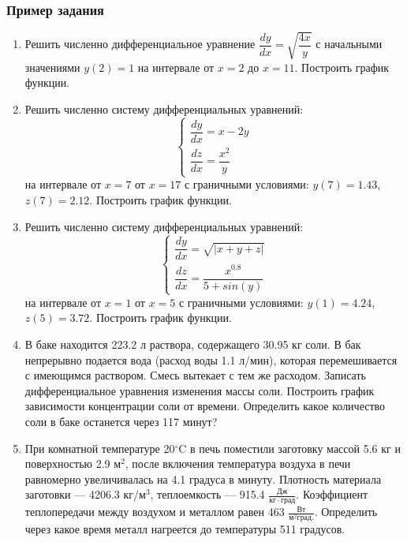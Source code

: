 \subsubsection*{Пример задания}
\begin{enumerate}
	\item Решить численно дифференциальное уравнение $\dfrac{dy}{dx}=\sqrt{\dfrac{4x}{y}}$ с начальными значениями $y(     2)=     1$ на интервале от $x=     2$ до $x=    11$. Построить график функции.\item Решить численно систему дифференциальных уравнений:
	\begin{equation*}
	\left\{
	\begin{gathered}
	\dfrac{dy}{dx}=x-2y                  \\
	\dfrac{dz}{dx}=\dfrac{x^2}{y}        
	\end{gathered}
	\right.
	\end{equation*}
	на интервале от $x= 7$ от $x=17$ с граничными условиями: $y( 7)=1.43$, $z( 7)=2.12$. Построить график функции. 
	\item Решить численно систему дифференциальных уравнений:
	\begin{equation*}
	\left\{
	\begin{gathered}
	\dfrac{dy}{dx}=\sqrt{|x+y+z|}\\
	\dfrac{dz}{dx}=\dfrac{x^{0.8}}{5+sin(y)}
	\end{gathered}
	\right.
	\end{equation*}
	на интервале от $x= 1$ от $x= 5$ с граничными условиями: $y( 1)=4.24$, $z( 5)=3.72$.  Построить график функции. 
	\item  В баке находится 223.2 л раствора, содержащего 30.95 кг соли. В бак непрерывно подается вода (расход воды 1.1 л/мин), которая перемешивается с имеющимся раствором. Смесь вытекает с тем же расходом. Записать дифференциальное уравнения изменения массы соли. Построить график зависимости концентрации соли от времени. Определить какое количество соли в баке останется через  117 минут?
	
	\item  При комнатной температуре 20$^\circ\mathrm{C}$ в печь поместили заготовку массой 5.6 кг и поверхностью 2.9 $\text{м}^2$, после включения температура воздуха в печи равномерно увеличивалась на 4.1 градуса в минуту. Плотность материала заготовки --- 4206.3 $\text{кг}/\text{м}^\mathrm{3}$, теплоемкость --- 915.4 $\frac{\text{Дж}}{\text{кг} \cdot град}$. Коэффициент теплопередачи между воздухом и металлом равен   463 $\frac{Вт}{м^2 град.}$. Определить через какое время металл нагреется до температуры   511 градусов.
\end{enumerate}
